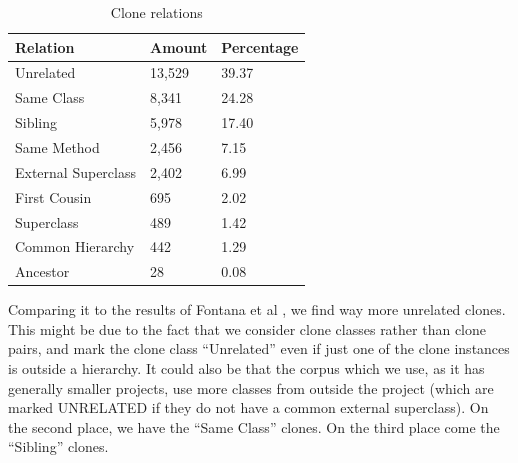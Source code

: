 \documentclass[a4paper]{article}
\begin{document}
\begin{table}[H]
  \begin{center}
  \caption{Clone relations} \label{table:relations}
  \bigskip
\begin{tabular}{|l|l|l|} \hline
\textbf{Relation}  & \textbf{Amount} & \textbf{Percentage} \\ \hline
Unrelated          & 13,529           & 39.37               \\ \hline
Same Class          & 8,341            & 24.28               \\ \hline
Sibling            & 5,978            & 17.40               \\ \hline
Same Method         & 2,456            & 7.15                \\ \hline
External Superclass & 2,402            & 6.99                \\ \hline
First Cousin        & 695             & 2.02                \\ \hline
Superclass         & 489             & 1.42                \\ \hline
Common Hierarchy    & 442             & 1.29                \\ \hline
Ancestor           & 28              & 0.08               \\ \hline
\end{tabular}
\end{center}
\end{table}

Comparing it to the results of Fontana et al \cite{fontana2015duplicated}, we find way more unrelated clones. This might be due to the fact that we consider clone classes rather than clone pairs, and mark the clone class ``Unrelated'' even if just one of the clone instances is outside a hierarchy. It could also be that the corpus which we use, as it has generally smaller projects, use more classes from outside the project (which are marked UNRELATED if they do not have a common external superclass). On the second place, we have the ``Same Class'' clones. On the third place come the ``Sibling'' clones.
\end{document}
